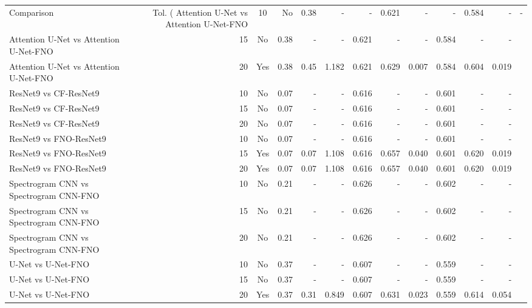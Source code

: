 \begin{tabular}{l r c r r r r r r r r r}
\toprule
Comparison & Tol. (%
\midrule
Attention U-Net vs Attention U-Net-FNO & 10 & No & 0.38 & - & - & 0.621 & - & - & 0.584 & - & - \\
Attention U-Net vs Attention U-Net-FNO & 15 & No & 0.38 & - & - & 0.621 & - & - & 0.584 & - & - \\
Attention U-Net vs Attention U-Net-FNO & 20 & Yes & 0.38 & 0.45 & 1.182 & 0.621 & 0.629 & 0.007 & 0.584 & 0.604 & 0.019 \\
ResNet9 vs CF-ResNet9 & 10 & No & 0.07 & - & - & 0.616 & - & - & 0.601 & - & - \\
ResNet9 vs CF-ResNet9 & 15 & No & 0.07 & - & - & 0.616 & - & - & 0.601 & - & - \\
ResNet9 vs CF-ResNet9 & 20 & No & 0.07 & - & - & 0.616 & - & - & 0.601 & - & - \\
ResNet9 vs FNO-ResNet9 & 10 & No & 0.07 & - & - & 0.616 & - & - & 0.601 & - & - \\
ResNet9 vs FNO-ResNet9 & 15 & Yes & 0.07 & 0.07 & 1.108 & 0.616 & 0.657 & 0.040 & 0.601 & 0.620 & 0.019 \\
ResNet9 vs FNO-ResNet9 & 20 & Yes & 0.07 & 0.07 & 1.108 & 0.616 & 0.657 & 0.040 & 0.601 & 0.620 & 0.019 \\
Spectrogram CNN vs Spectrogram CNN-FNO & 10 & No & 0.21 & - & - & 0.626 & - & - & 0.602 & - & - \\
Spectrogram CNN vs Spectrogram CNN-FNO & 15 & No & 0.21 & - & - & 0.626 & - & - & 0.602 & - & - \\
Spectrogram CNN vs Spectrogram CNN-FNO & 20 & No & 0.21 & - & - & 0.626 & - & - & 0.602 & - & - \\
U-Net vs U-Net-FNO & 10 & No & 0.37 & - & - & 0.607 & - & - & 0.559 & - & - \\
U-Net vs U-Net-FNO & 15 & No & 0.37 & - & - & 0.607 & - & - & 0.559 & - & - \\
U-Net vs U-Net-FNO & 20 & Yes & 0.37 & 0.31 & 0.849 & 0.607 & 0.631 & 0.023 & 0.559 & 0.614 & 0.054 \\
\bottomrule
\end{tabular}
